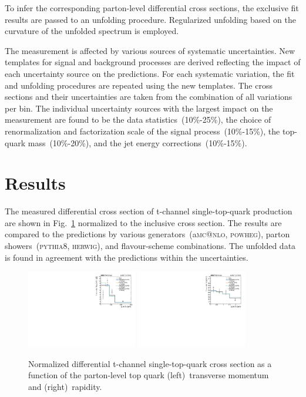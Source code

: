 \documentclass[12pt]{article}
\begin{document}
To infer the corresponding parton-level differential cross sections, the exclusive fit results are passed to an unfolding procedure. Regularized unfolding based on the curvature of the unfolded spectrum is employed. 

The measurement is affected by various sources of systematic uncertainties. New templates for signal and background processes are derived reflecting the impact of each uncertainty source on the predictions. For each systematic variation, the fit and unfolding procedures are repeated using the new templates. The cross sections and their uncertainties are taken from the combination of all variations per bin. The individual uncertainty sources with the largest impact on the measurement are found to be the data statistics~(10\%-25\%), the choice of renormalization and factorization scale of the signal process~(10\%-15\%), the top-quark mass~(10\%-20\%), and the jet energy corrections~(10\%-15\%).

\section{Results}

The measured differential cross section of t-channel single-top-quark production are shown in Fig.~\ref{fig:result} normalized to the inclusive cross section. The results are compared to the predictions by various generators~(a\textsc{mc@nlo}, \textsc{powheg}), parton showers~(\textsc{pythia}8, \textsc{herwig}), and flavour-scheme combinations. The unfolded data is found in agreement with the predictions within the uncertainties.

\begin{figure}[!htbp]
\begin{center}
\includegraphics[width=0.43\textwidth]{figures/result/unfolded_top_pt.pdf}\hspace{0.05\textwidth}
\includegraphics[width=0.43\textwidth]{figures/result/unfolded_top_y.pdf}
\end{center}

\caption{\label{fig:result}Normalized differential t-channel single-top-quark cross section as a function of the parton-level top quark (left)~transverse momentum and (right)~rapidity.}
\end{figure}
\end{document}
